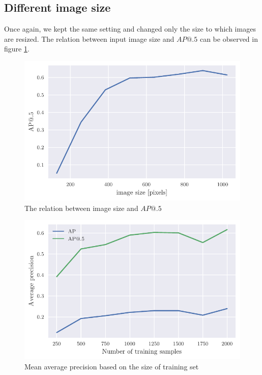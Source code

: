 \subsection{Different image size}
Once again, we kept the same setting and changed only the size to which images are resized. The relation between input image size and $AP@.5$ can be observed in figure \ref{fig:img_sizes}.

\begin{paracol}{2}
    \begin{figure}
        \centering
        \includegraphics[width=0.99\linewidth]{images/img_size_dependency.pdf}
        \caption{The relation between image size and $AP@.5$}
        \label{fig:img_sizes}
    \end{figure}
    \switchcolumn
    \begin{figure}
        \centering
        \includegraphics[width=0.99\linewidth]{images/training_set_dependency.pdf}
        \caption{Mean average precision based on the size of training set}
        \label{fig:training_set_sizes}
    \end{figure}
\end{paracol}

